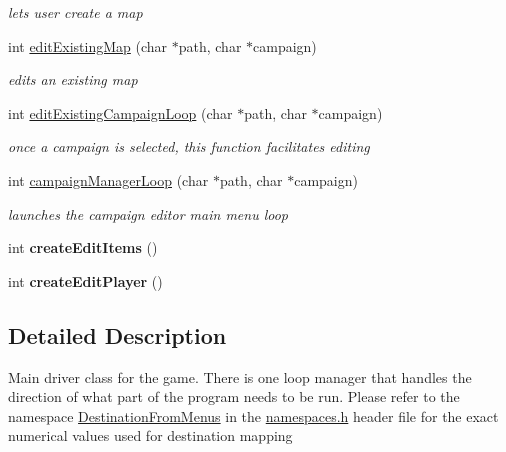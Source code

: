 \begin{DoxyCompactItemize}
\begin{DoxyCompactList}\small\item\em lets user create a map \end{DoxyCompactList}\item 
\hypertarget{class_game_loops_a2874d34df0e78bb7b2ed1ffb95c0858e}{}\label{class_game_loops_a2874d34df0e78bb7b2ed1ffb95c0858e} 
int \hyperlink{class_game_loops_a2874d34df0e78bb7b2ed1ffb95c0858e}{edit\+Existing\+Map} (char $\ast$path, char $\ast$campaign)
\begin{DoxyCompactList}\small\item\em edits an existing map \end{DoxyCompactList}\item 
\hypertarget{class_game_loops_a4b51acac6c216a920ae948bf5d60e303}{}\label{class_game_loops_a4b51acac6c216a920ae948bf5d60e303} 
int \hyperlink{class_game_loops_a4b51acac6c216a920ae948bf5d60e303}{edit\+Existing\+Campaign\+Loop} (char $\ast$path, char $\ast$campaign)
\begin{DoxyCompactList}\small\item\em once a campaign is selected, this function facilitates editing \end{DoxyCompactList}\item 
\hypertarget{class_game_loops_a653666df83695774b11c7ee483a5944b}{}\label{class_game_loops_a653666df83695774b11c7ee483a5944b} 
int \hyperlink{class_game_loops_a653666df83695774b11c7ee483a5944b}{campaign\+Manager\+Loop} (char $\ast$path, char $\ast$campaign)
\begin{DoxyCompactList}\small\item\em launches the campaign editor main menu loop \end{DoxyCompactList}\item 
\hypertarget{class_game_loops_a89a697c5e7d1542c788c6e66c9699494}{}\label{class_game_loops_a89a697c5e7d1542c788c6e66c9699494} 
int {\bfseries create\+Edit\+Items} ()
\item 
\hypertarget{class_game_loops_a94b59a3e91685adfec0c1963e67b2348}{}\label{class_game_loops_a94b59a3e91685adfec0c1963e67b2348} 
int {\bfseries create\+Edit\+Player} ()
\end{DoxyCompactItemize}


\subsection{Detailed Description}
Main driver class for the game. There is one loop manager that handles the direction of what part of the program needs to be run. Please refer to the namespace \hyperlink{namespace_destination_from_menus}{Destination\+From\+Menus} in the \hyperlink{namespaces_8h}{namespaces.\+h} header file for the exact numerical values used for destination mapping 


